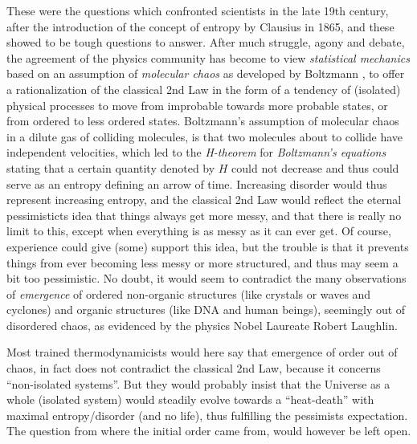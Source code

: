 These were the questions which confronted scientists 
in the late 19th century, after the introduction  of the concept of entropy
by Clausius in 1865, and these showed to be tough questions to answer.
After much struggle, agony and debate, the agreement of the 
physics community has become to  
view \emph{statistical mechanics} based on an
assumption of \emph{molecular chaos} as developed by Boltzmann 
\cite{boltzmann}, 
to offer a rationalization of the classical 2nd Law in the form
of a tendency of (isolated) physical processes to move from improbable towards 
more probable states, or from ordered to less ordered states.
Boltzmann's assumption of molecular chaos in a dilute gas of colliding
molecules, is that two molecules about to collide have
independent velocities, which led to the \emph{H-theorem} 
for \emph{Boltzmann's equations} stating that a certain quantity
denoted by $H$ could not decrease and thus could serve as
an entropy defining an arrow of time. 
Increasing disorder would thus represent increasing entropy, and the
classical 2nd Law would reflect the eternal pessimisticts idea that things 
always get more messy, and 
that there is really no limit to this,
except when everything is as messy as it can ever get. Of course, experience
could give (some) support this idea, but the trouble is that it prevents things
from ever becoming less messy or more structured, and 
thus may seem a bit too pessimistic.
No doubt, it would seem to contradict the many observations of 
\emph{emergence} of ordered non-organic structures (like crystals or
waves and cyclones) and organic structures (like DNA and human beings), 
seemingly out of disordered chaos, as evidenced by the physics
Nobel Laureate Robert Laughlin.%

Most trained thermodynamicists
would here say that emergence of order
out of chaos, in fact does not contradict the classical 2nd Law, 
because it concerns 
``non-isolated systems''. But they would probably insist that  
the Universe as a whole (isolated system) would steadily evolve towards a   
``heat-death'' with maximal entropy/disorder (and no life), thus
fulfilling the pessimists expectation. The question from where the
initial order came from, would however be left open.

